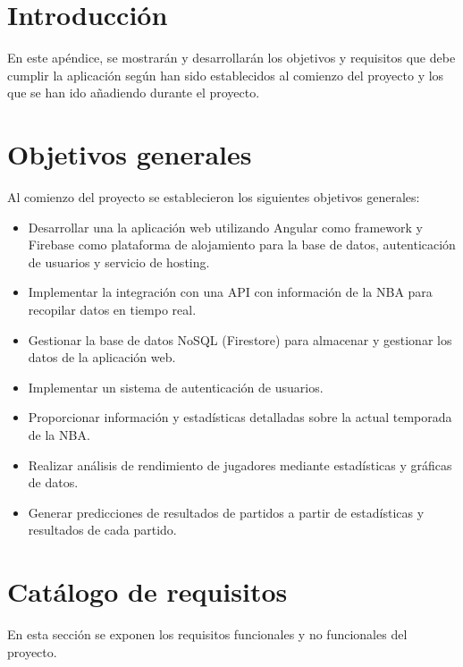 
\section{Introducción}

En este apéndice, se mostrarán y desarrollarán los objetivos y requisitos que debe cumplir la aplicación según han sido establecidos al comienzo del proyecto y los que se han ido añadiendo durante el proyecto.


\section{Objetivos generales}
Al comienzo del proyecto se establecieron los siguientes objetivos generales:
\begin{itemize}
\tightlist
    \item 
        Desarrollar una la aplicación web utilizando Angular como framework y Firebase como plataforma de alojamiento para la base de datos, autenticación de usuarios y servicio de hosting.
    \item
        Implementar la integración con una API con información de la NBA para recopilar datos en tiempo real. 
    \item 
        Gestionar la base de datos NoSQL (Firestore) para almacenar y gestionar los datos de la aplicación web.
    \item 
        Implementar un sistema de autenticación de usuarios.
    \item 
        Proporcionar información y estadísticas detalladas sobre la actual temporada de la NBA. 
    \item 
        Realizar análisis de rendimiento de jugadores mediante estadísticas y gráficas de datos.
    \item 
        Generar predicciones de resultados de partidos a partir de estadísticas y resultados de cada partido.
\end{itemize}


\section{Catálogo de requisitos}
En esta sección se exponen los requisitos funcionales y no funcionales del proyecto.

